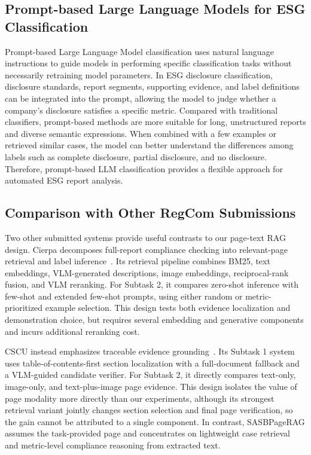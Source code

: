 \documentclass[sigconf,article]{acmart}
\newcommand{\SASBPageRAG}{SASB\-Page\-RAG}
\begin{document}
\subsection{Prompt-based Large Language Models for ESG Classification}
Prompt-based Large Language Model classification uses natural language instructions to guide models in performing specific classification tasks without necessarily retraining model parameters. In ESG disclosure classification, disclosure standards, report segments, supporting evidence, and label definitions can be integrated into the prompt, allowing the model to judge whether a company's disclosure satisfies a specific metric. Compared with traditional classifiers, prompt-based methods are more suitable for long, unstructured reports and diverse semantic expressions. When combined with a few examples or retrieved similar cases, the model can better understand the differences among labels such as complete disclosure, partial disclosure, and no disclosure. Therefore, prompt-based LLM classification provides a flexible approach for automated ESG report analysis.

\subsection{Comparison with Other RegCom Submissions}
Two other submitted systems provide useful contrasts to our page-text RAG design. Cierpa decomposes full-report compliance checking into relevant-page retrieval and label inference~\cite{endo2026cierpa}. Its retrieval pipeline combines BM25, text embeddings, VLM-generated descriptions, image embeddings, reciprocal-rank fusion, and VLM reranking. For Subtask 2, it compares zero-shot inference with few-shot and extended few-shot prompts, using either random or metric-prioritized example selection. This design tests both evidence localization and demonstration choice, but requires several embedding and generative components and incurs additional reranking cost.

CSCU instead emphasizes traceable evidence grounding~\cite{boonsuriyatham2026cscu}. Its Subtask 1 system uses table-of-contents-first section localization with a full-document fallback and a VLM-guided candidate verifier. For Subtask 2, it directly compares text-only, image-only, and text-plus-image page evidence. This design isolates the value of page modality more directly than our experiments, although its strongest retrieval variant jointly changes section selection and final page verification, so the gain cannot be attributed to a single component. In contrast, \SASBPageRAG{} assumes the task-provided page and concentrates on lightweight case retrieval and metric-level compliance reasoning from extracted text.
\end{document}
